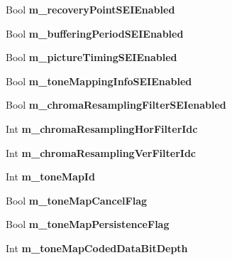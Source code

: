 \begin{DoxyCompactItemize}
Bool {\bfseries m\+\_\+recovery\+Point\+S\+E\+I\+Enabled}
\item 
\mbox{\label{class_t_app_enc_cfg_a0d5f027529267b34f87586352bc29bb5}} 
Bool {\bfseries m\+\_\+buffering\+Period\+S\+E\+I\+Enabled}
\item 
\mbox{\label{class_t_app_enc_cfg_aff6ddf23cdb877c1a4f64851d2660a35}} 
Bool {\bfseries m\+\_\+picture\+Timing\+S\+E\+I\+Enabled}
\item 
\mbox{\label{class_t_app_enc_cfg_ae129467c6fb8612ad8289543df94317c}} 
Bool {\bfseries m\+\_\+tone\+Mapping\+Info\+S\+E\+I\+Enabled}
\item 
\mbox{\label{class_t_app_enc_cfg_a84ebd34fcc5db758c780a2490d2fe5af}} 
Bool {\bfseries m\+\_\+chroma\+Resampling\+Filter\+S\+E\+Ienabled}
\item 
\mbox{\label{class_t_app_enc_cfg_adc8a637ba86cf2392ce395df07092e49}} 
Int {\bfseries m\+\_\+chroma\+Resampling\+Hor\+Filter\+Idc}
\item 
\mbox{\label{class_t_app_enc_cfg_af97b127f3cdb8ec43bd4afb438f09c76}} 
Int {\bfseries m\+\_\+chroma\+Resampling\+Ver\+Filter\+Idc}
\item 
\mbox{\label{class_t_app_enc_cfg_ab5cc7f35280a4426250ee458e7470630}} 
Int {\bfseries m\+\_\+tone\+Map\+Id}
\item 
\mbox{\label{class_t_app_enc_cfg_a7800de98ceeff7613b226ab44a6d1e39}} 
Bool {\bfseries m\+\_\+tone\+Map\+Cancel\+Flag}
\item 
\mbox{\label{class_t_app_enc_cfg_a64ddbc910a88ff0951dc4a6807fb3801}} 
Bool {\bfseries m\+\_\+tone\+Map\+Persistence\+Flag}
\item 
\mbox{\label{class_t_app_enc_cfg_aedbfd14b13c9af2845c0ae169815e840}} 
Int {\bfseries m\+\_\+tone\+Map\+Coded\+Data\+Bit\+Depth}
\item 
\mbox{\label{class_t_app_enc_cfg_aabfad9895c928f4b1adf472b8d187405}} 

\end{DoxyCompactItemize}
